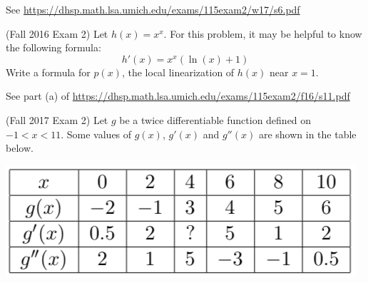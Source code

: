 \documentclass[11pt]{exam}
\begin{document}
\begin{questions}
\begin{solution}
  See \href{https://dhsp.math.lsa.umich.edu/exams/115exam2/w17/s6.pdf}{https://dhsp.math.lsa.umich.edu/exams/115exam2/w17/s6.pdf}
\end{solution}
\vspace{0.4in}
\question (Fall 2016 Exam 2) %
  Let $h(x) = x^x$. For this problem, it may be helpful to know the following formula:
$$h'(x) = x^x (\ln(x)+1) %
$$
Write a formula for \(p(x)\), the local linearization of \(h(x)\) near
\(x=1\). 
\begin{solution}
  See part (a) of \href{https://dhsp.math.lsa.umich.edu/exams/115exam2/f16/s11.pdf}{https://dhsp.math.lsa.umich.edu/exams/115exam2/f16/s11.pdf}
\end{solution}
\pagebreak
\question (Fall 2017 Exam 2) %
	Let $g$ be a twice differentiable function defined on $-1 < x < 11$. Some values of $g(x)$, $g'(x)$ and $g''(x)$ are shown in the table below.
        \begin{center}
          \includegraphics[scale=0.4]{Figures/tableg}

\end{center}
\end{questions}
\end{document}
